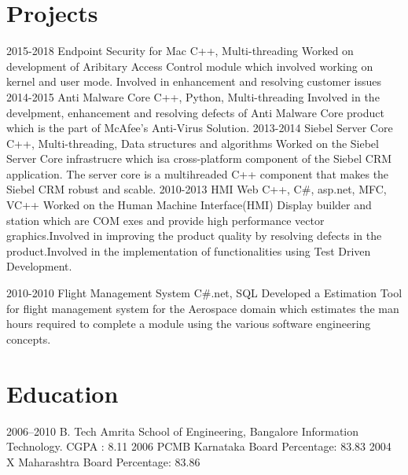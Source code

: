 \documentclass[]{kartikkumar-cv}
\begin{document}
\section{Projects}

\begin{entrylist}
	 \entry
	{2015-2018}
	{Endpoint Security for Mac}
	{C++, Multi-threading}
	{Worked on development of Aribitary Access Control module which involved working
	on kernel and user mode.
	Involved in enhancement and resolving customer issues}
  \entry
    {2014-2015}
    {Anti Malware Core}
    {C++, Python, Multi-threading}
    {Involved in the develpment, enhancement and resolving defects of Anti
    Malware Core product which is the part of McAfee's Anti-Virus Solution.}
  \entry
    {2013-2014}
    {Siebel Server Core}
    {C++, Multi-threading, Data structures and algorithms }
    {Worked on the Siebel Server Core infrastrucre which isa cross-platform
    component of the Siebel CRM application. The server core is a multihreaded
    C++ component that makes the Siebel CRM robust and scable.}
  \entry
    {2010-2013}
    {HMI Web}
    {C++, C\#, asp.net, MFC, VC++}
    {Worked on the Human Machine Interface(HMI) Display builder and station
    which are COM exes and provide high performance vector graphics.Involved in improving the product quality by resolving defects in the product.Involved in the implementation of functionalities using Test Driven
    Development.}
    
  \entry
  {2010-2010}
  {Flight Management System}
  {C\#.net, SQL}
  {Developed a Estimation Tool for flight management system for the
  Aerospace domain which estimates the man hours required to complete a
  module using the various software engineering concepts.}
    
\end{entrylist}


\section{Education}

\begin{entrylist}
  \entry
    {2006–2010}
    {B. Tech }
    {Amrita School of Engineering, Bangalore}
    {Information Technology. CGPA : 8.11}
  \entry
    {2006}
    {PCMB}
    {Karnataka Board}
    {Percentage: 83.83}
  \entry
    {2004}
    {X}
    {Maharashtra Board}
    {Percentage: 83.86}
\end{entrylist}
\end{document}
